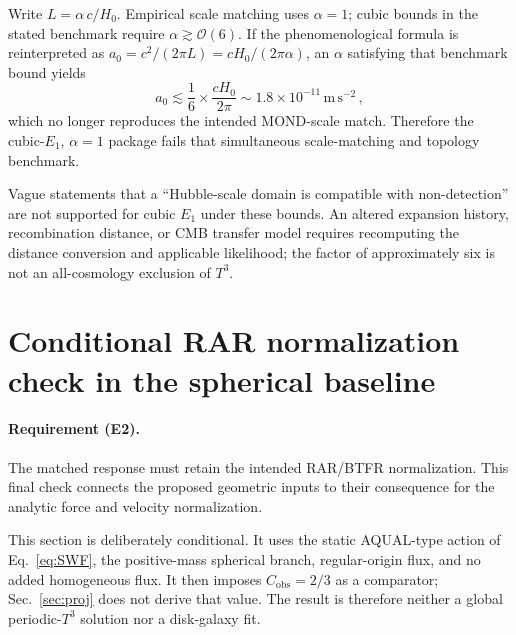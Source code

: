 \documentclass[aps,prd,reprint,superscriptaddress,nofootinbib,floatfix,showkeys]{revtex4-2}
\newcommand{\Tthree}{T^{3}}
\newcommand{\Cobs}{C_{\mathrm{obs}}}
\newcommand{\azero}{a_{0}}
\newcommand{\Hzero}{H_{0}}
\begin{document}
Write \(L=\alpha\,c/\Hzero\).  Empirical scale matching uses \(\alpha=1\);
cubic bounds in the stated benchmark require \(\alpha\gtrsim\mathcal{O}(6)\). If the phenomenological
formula is reinterpreted as \(\azero=c^{2}/(2\pi L)=c\Hzero/(2\pi\alpha)\),
an \(\alpha\) satisfying that benchmark bound yields
\begin{equation}
  \azero \lesssim \frac{1}{6}\times\frac{c\Hzero}{2\pi}
  \sim 1.8\times 10^{-11}\,\mathrm{m\,s^{-2}}\,,
  \label{eq:a0-suppressed}
\end{equation}
which no longer reproduces the intended MOND-scale match.  Therefore the
cubic-\(E_1\), \(\alpha=1\) package fails that simultaneous scale-matching
and topology benchmark.

Vague statements that a ``Hubble-scale domain is compatible with non-detection''
are not supported for cubic \(E_1\) under these bounds.
An altered expansion history, recombination distance, or CMB transfer model
requires recomputing the distance conversion and applicable likelihood;
the factor of approximately six is not an all-cosmology exclusion of \(T^3\).

\section{Conditional RAR normalization check in the spherical baseline}
\label{sec:rar}

\paragraph{Requirement (E2).}
The matched response must retain the intended RAR/BTFR normalization.
This final check connects the proposed geometric inputs to their consequence
for the analytic force and velocity normalization.

This section is deliberately conditional.  It uses the static AQUAL-type
action of Eq.~\eqref{eq:SWF}, the positive-mass spherical branch, regular-origin
flux, and no added homogeneous flux.  It then imposes \(\Cobs=2/3\) as a
comparator; Sec.~\ref{sec:proj} does not derive that value.  The result is
therefore neither a global periodic-\(\Tthree\) solution nor a disk-galaxy fit.
\end{document}
